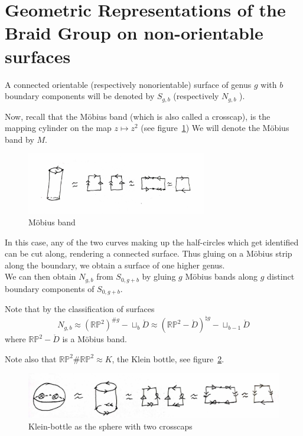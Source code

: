\documentclass[reqno]{amsart}
\theoremstyle{definition}
\theoremstyle{remark}
\begin{document}
\section{Geometric Representations of the Braid Group on
non-orientable surfaces}


A connected orientable (respectively nonorientable) surface
of genus $g$ with $b$ boundary components will
be denoted by $S_{g,b}$ (respectively $N_{g,b}$ ).

Now, recall that the Möbius band (which is also called
a crosscap), is the mapping cylinder on the map
$z \mapsto z^2$ (see figure~\ref{fig:mapping-cylinder-mobius})
We will denote the Möbius band by $M$.


\begin{figure}[htpb]
    \centering
    \includegraphics[width=0.7\textwidth]{mapping-cylinder-mobius.jpg}
    \caption{Möbius band}
    \label{fig:mapping-cylinder-mobius}
\end{figure}

In this case, any of the two curves making up the half-circles which
get identified can be cut along, rendering a connected surface.
Thus gluing on a Möbius strip along the boundary, we obtain a
surface of one higher genus.\\


We can then obtain $N_{g,b}$ from $S_{0,g+b}$ by
gluing $g$ Möbius bands along $g$ distinct boundary
components of $S_{0,g+b}$.

Note that by the classification of surfaces
\[
N_{g,b} \approx \left( \mathbb{R}\mathbb{P}^2 \right)^{\# g} -
\sqcup_{b} \mathring{D} \approx 
 \left(\mathbb{R}\mathbb{P}^2 - \mathring{D} 
\right)^{\natural g} - \sqcup_{b-1} \mathring{D}
\] 
where $\mathbb{R}\mathbb{P}^2 - \mathring{D}$ is a Möbius band.

Note also that $\mathbb{R}\mathbb{P}^2 \# \mathbb{R}\mathbb{P}^2
\approx K$, the Klein bottle,
see figure~\ref{fig:klein-bottle}.


\begin{figure}[H]
    \centering
    \includegraphics[width=1.2\textwidth]{klein-bottle.jpg}
    \caption{Klein-bottle as the sphere with two crosscaps}
    \label{fig:klein-bottle}
\end{figure}
\end{document}
